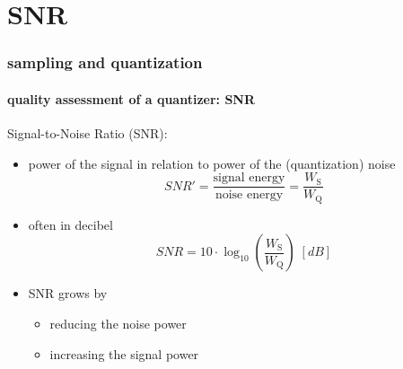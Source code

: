 \section[SNR]{SNR}
	\begin{frame}\frametitle{sampling and quantization}\framesubtitle{quality assessment of a quantizer: SNR}
        Signal-to-Noise Ratio (SNR): 
        \begin{itemize}
            \item power of the signal in relation to power of the (quantization) noise
                \begin{equation*}\nonumber
                    SNR' = \frac{\text{signal energy}}{\text{noise energy}} = \frac{W_{\mathrm{S}}}{W_{\mathrm{Q}}}
                \end{equation*}
            \smallskip
            \item<2-> often in decibel
                \begin{equation*}\label{eq:snr}
                    SNR = 10\cdot\log_{10}\left(\frac{W_{\mathrm{S}}}{W_{\mathrm{Q}}}\right)\; [dB] 
                \end{equation*}
            \smallskip
            \item<3-> SNR grows by
                \begin{itemize}
                    \item   reducing the noise power
                    \item   increasing the signal power
                \end{itemize}
        \end{itemize}
	\end{frame}		
	
